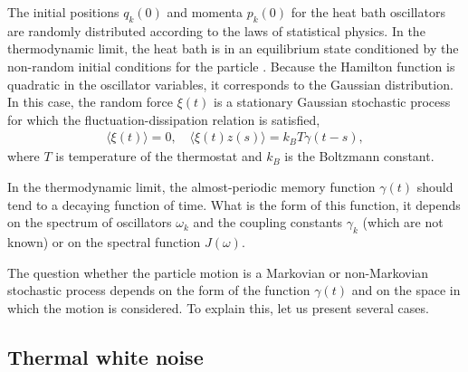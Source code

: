 \documentclass[authoryear,draft,1p,times]{elsarticle}
\renewcommand{\=}{\stackrel{\mathrm{d}}{=}}
\begin{document}
%
The initial positions $q_k(0)$ and momenta $p_k(0)$ 
for the heat bath oscillators  are 
 randomly distributed according to the laws of statistical physics.
In the thermodynamic limit, 
 the heat bath is in an equilibrium state 
conditioned by the non-random initial conditions for the particle 
\cite{peter1,kupfer}. 
Because the Hamilton function   
is quadratic in the oscillator variables, 
it corresponds to the Gaussian distribution. In this case, 
the random force $\xi(t) $ is a stationary Gaussian stochastic process  
for which the fluctuation-dissipation relation is satisfied, 
%
\begin{eqnarray}
\label{mom}
\langle \xi(t) \rangle = 0, \quad
\langle \xi(t)  z(s)\rangle = k_BT \gamma(t-s),
\end{eqnarray} 
%
where $T$ is temperature of the thermostat and $k_B$ is the 
Boltzmann constant. 

In the thermodynamic limit, the almost-periodic memory function $\gamma(t)$ 
should tend to a decaying function of time. 
What is the form of this function, it depends on the spectrum of oscillators 
$\omega_k$  and the coupling constants   $\gamma_k$ (which are not known) or on  
the spectral function $J(\omega)$. 

The question whether the particle motion is a Markovian or non-Markovian 
stochastic process depends on the form of the function $\gamma(t)$ and on 
the space in which the motion is considered. To explain this, let us 
present several cases. 


\subsection{Thermal white noise}
\end{document}
